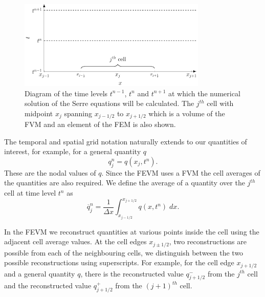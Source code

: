 \begin{figure}
	\centering
	\includegraphics[width=0.8\textwidth]{./chp3/figures/Discretisation.pdf}
	\caption{Diagram of the time levels $t^{n-1}$, $t^n$ and $t^{n+1}$ at which the numerical solution of the Serre equations will be calculated. The $j^{th}$ cell with midpoint $x_{j}$ spanning $x_{j-1/2}$ to $x_{j+1/2}$ which is a volume of the FVM and an element of the FEM is also shown.}
	\label{fig:NumericalGrid}
\end{figure}

The temporal and spatial grid notation naturally extends to our quantities of interest, for example, for a general quantity $q$
\begin{equation*}
q^n_j = q(x_j ,t^n). 
\end{equation*}
These are the nodal values of $q$. Since the FEVM uses a FVM the cell averages of the quantities are also required. We define the average of a quantity over the $j^{th}$ cell at time level $t^n$ as
\begin{equation*}
\overline{q}_j^n = \frac{1}{\Delta x} \int_{x_{j-1/2}}^{x_{j+1/2}} q(x,t^n) \; dx.
\end{equation*}

In the FEVM we reconstruct quantities at various points inside the cell using the adjacent cell average values. At the cell edges $x_{j\pm1/2}$, two reconstructions are possible from each of the neighbouring cells, we distinguish between the two possible reconstructions using superscripts. For example, for the cell edge $x_{j+1/2}$ and a general quantity $q$, there is the reconstructed value $q^-_{j+1/2}$ from the $j^{th}$ cell and the reconstructed value $q^+_{j+1/2}$ from the $(j+1)^{th}$ cell.

